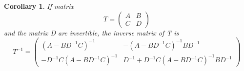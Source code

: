 \documentclass{article}
\newtheorem{corollary}{Corollary}
\begin{document}
    \begin{corollary}
         If matrix
        $$
            T = 
            \begin{pmatrix}
                A & B \\
                C & D
            \end{pmatrix}
        $$
        and the matrix D are invertible, the inverse matrix of T is
        $$
            T^{-1} = 
            \begin{pmatrix}
                (A - B D^{-1} C)^{-1} & -(A - B D^{-1} C)^{-1} B D^{-1} \\
                -D^{-1} C (A - B D^{-1} C)^{-1} & D^{-1} + D^{-1} C (A - B D^{-1} C)^{-1} B D^{-1}
            \end{pmatrix}
        $$
    \end{corollary}
    
\end{document}
